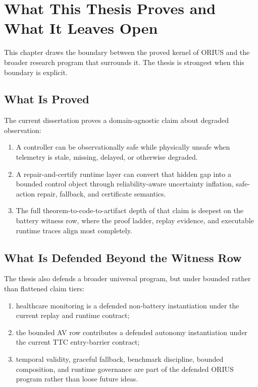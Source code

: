 \chapter{What This Thesis Proves and What It Leaves Open}
\label{ch:what-proves}

This chapter draws the boundary between the proved kernel of ORIUS and the
broader research program that surrounds it. The thesis is strongest when this
boundary is explicit.

\section{What Is Proved}

The current dissertation proves a domain-agnostic claim about degraded
observation:

\begin{enumerate}
  \item A controller can be observationally safe while physically unsafe when
    telemetry is stale, missing, delayed, or otherwise degraded.
  \item A repair-and-certify runtime layer can convert that hidden gap into a
    bounded control object through reliability-aware uncertainty inflation,
    safe-action repair, fallback, and certificate semantics.
  \item The full theorem-to-code-to-artifact depth of that claim is deepest on
    the battery witness row, where the proof ladder, replay evidence, and
    executable runtime traces align most completely.
\end{enumerate}

\section{What Is Defended Beyond the Witness Row}

The thesis also defends a broader universal program, but under bounded rather
than flattened claim tiers:

\begin{enumerate}
  \item healthcare monitoring is a defended non-battery instantiation under
    the current replay and runtime contract;
  \item the bounded AV row contributes a defended autonomy instantiation under
    the current TTC entry-barrier contract;
  \item temporal validity, graceful fallback, benchmark discipline, bounded
    composition, and runtime governance are part of the defended ORIUS program
    rather than loose future ideas.
\end{enumerate}

